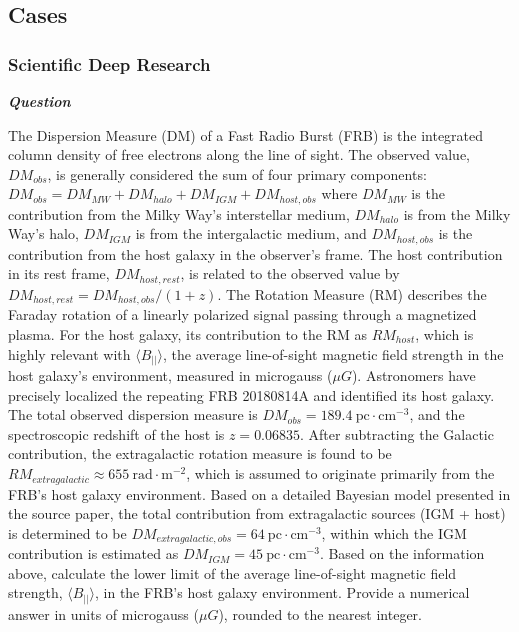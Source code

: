 \subsection{Cases}

\subsubsection{Scientific Deep Research}

\begin{tcolorbox}[
    breakable,
    title=Example of Scientific Deep Research in Astronomy,
    colback=LighterGray,
    colframe=DeepPurple,
    colbacktitle=DeepPurple,
    coltitle=White,
]
\textbf{\emph{\textcolor{DeepPurple}{Question}}}

The Dispersion Measure (DM) of a Fast Radio Burst (FRB) is the integrated column density of free electrons along the line of sight. The observed value, $DM_{obs}$, is generally considered the sum of four primary components:
$DM_{obs} = DM_{MW} + DM_{halo} + DM_{IGM} + DM_{host,obs}$
where $DM_{MW}$ is the contribution from the Milky Way's interstellar medium, $DM_{halo}$ is from the Milky Way's halo, $DM_{IGM}$ is from the intergalactic medium, and $DM_{host,obs}$ is the contribution from the host galaxy in the observer's frame. The host contribution in its rest frame, $DM_{host,rest}$, is related to the observed value by $DM_{host,rest} = DM_{host,obs} / (1+z)$.
The Rotation Measure (RM) describes the Faraday rotation of a linearly polarized signal passing through a magnetized plasma. For the host galaxy, its contribution to the RM  as $RM_{host}$, which is highly relevant with $\langle B_{||} \rangle$, the average line-of-sight magnetic field strength in the host galaxy's environment, measured in microgauss ($\mu G$).
Astronomers have precisely localized the repeating FRB 20180814A and identified its host galaxy. The total observed dispersion measure is $DM_{obs} = 189.4 \ \text{pc} \cdot \text{cm}^{-3}$, and the spectroscopic redshift of the host is $z = 0.06835$. After subtracting the Galactic contribution, the extragalactic rotation measure is found to be $RM_{extragalactic} \approx 655 \ \text{rad} \cdot \text{m}^{-2}$, which is assumed to originate primarily from the FRB's host galaxy environment. Based on a detailed Bayesian model presented in the source paper, the total contribution from extragalactic sources (IGM + host) is determined to be $DM_{extragalactic,obs} = 64 \ \text{pc} \cdot \text{cm}^{-3}$, within which the IGM contribution is estimated as $DM_{IGM} = 45 \ \text{pc} \cdot \text{cm}^{-3}$.
Based on the information above, calculate the lower limit of the average line-of-sight magnetic field strength, $\langle B_{||} \rangle$, in the FRB's host galaxy environment. Provide a numerical answer in units of microgauss ($\mu G$), rounded to the nearest integer.


\end{tcolorbox}
